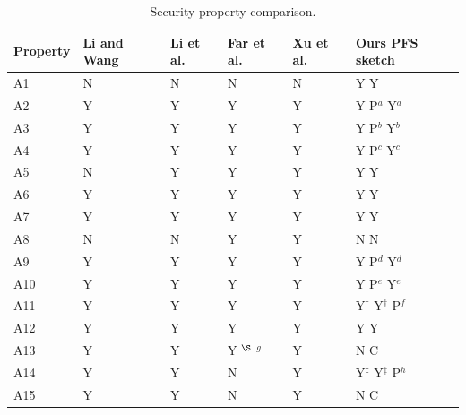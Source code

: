 \documentclass[cmc,article,submit,moreauthors,pdftex]{Definitions/tsp}
\providecommand{\DIFadd}[1]{{\protect\color{blue} \sf #1}} %
\providecommand{\DIFdel}[1]{{\protect\color{red} \scriptsize #1}} %
\providecommand{\DIFaddFL}[1]{\DIFadd{#1}} %
\providecommand{\DIFdelFL}[1]{\DIFdel{#1}} %
\providecommand{\DIFaddbeginFL}{} %
\providecommand{\DIFaddendFL}{} %
\providecommand{\DIFdelbeginFL}{} %
\providecommand{\DIFdelendFL}{} %
\begin{document}
\begin{table}[t]
\caption{Security-property comparison.\label{tab:security}}
\DIFdelbeginFL %
\DIFdelendFL \DIFaddbeginFL \begin{tabularx}{\textwidth}{lYYYYY}
\DIFaddendFL \toprule
\textbf{Property} & \textbf{Li and Wang \cite{li2019twofactor}} & \textbf{Li et al. \cite{li2018ecc}} & \textbf{Far et al. \cite{far}} & \textbf{Xu et al. \cite{xu}} & \textbf{Ours}\DIFdelbeginFL %
\DIFdelFL{\textbf{PFS sketch}}\DIFdelendFL \\
\midrule
A1  & N & N & N & N & Y\DIFdelbeginFL %
\DIFdelFL{Y}\DIFdelendFL \\
A2  & Y & Y & Y & Y & \DIFdelbeginFL \DIFdelFL{Y}\DIFdelendFL \DIFaddbeginFL \DIFaddFL{P}\DIFaddendFL $^{a}$\DIFdelbeginFL %
\DIFdelFL{Y$^{a}$}\DIFdelendFL \\
A3  & Y & Y & Y & Y & \DIFdelbeginFL \DIFdelFL{Y}\DIFdelendFL \DIFaddbeginFL \DIFaddFL{P}\DIFaddendFL $^{b}$\DIFdelbeginFL %
\DIFdelFL{Y$^{b}$}\DIFdelendFL \\
A4  & Y & Y & Y & Y & \DIFdelbeginFL \DIFdelFL{Y}\DIFdelendFL \DIFaddbeginFL \DIFaddFL{P}\DIFaddendFL $^{c}$\DIFdelbeginFL %
\DIFdelFL{Y$^{c}$}\DIFdelendFL \\
A5  & N & Y & Y & Y & Y\DIFdelbeginFL %
\DIFdelFL{Y}\DIFdelendFL \\
A6  & Y & Y & Y & Y & Y\DIFdelbeginFL %
\DIFdelFL{Y}\DIFdelendFL \\
A7  & Y & Y & Y & Y & Y\DIFdelbeginFL %
\DIFdelFL{Y}\DIFdelendFL \\
A8  & N & N & Y & Y & N\DIFdelbeginFL %
\DIFdelFL{N}\DIFdelendFL \\
A9  & Y & Y & Y & Y & \DIFdelbeginFL \DIFdelFL{Y}\DIFdelendFL \DIFaddbeginFL \DIFaddFL{P}\DIFaddendFL $^{d}$\DIFdelbeginFL %
\DIFdelFL{Y$^{d}$}\DIFdelendFL \\
A10 & Y & Y & Y & Y & \DIFdelbeginFL \DIFdelFL{Y}\DIFdelendFL \DIFaddbeginFL \DIFaddFL{P}\DIFaddendFL $^{e}$\DIFdelbeginFL %
\DIFdelFL{Y$^{e}$}\DIFdelendFL \\
A11 & Y & Y & Y & Y & \DIFdelbeginFL \DIFdelFL{Y$^{\dagger}$ }%
\DIFdelFL{Y$^{\dagger}$}\DIFdelendFL \DIFaddbeginFL \DIFaddFL{P$^{f}$}\DIFaddendFL \\
A12 & Y & Y & Y & Y & Y\DIFdelbeginFL %
\DIFdelFL{Y}\DIFdelendFL \\
\midrule
A13 & Y & Y & Y\DIFdelbeginFL \DIFdelFL{$^{\S}$ }\DIFdelendFL \DIFaddbeginFL \DIFaddFL{$^{g}$ }\DIFaddendFL & Y & N\DIFdelbeginFL %
\DIFdelFL{C}\DIFdelendFL \\
A14 & Y & Y & N & Y & \DIFdelbeginFL \DIFdelFL{Y$^{\ddagger}$ }%
\DIFdelFL{Y$^{\ddagger}$}\DIFdelendFL \DIFaddbeginFL \DIFaddFL{P$^{h}$}\DIFaddendFL \\
A15 & Y & Y & N & Y & N\DIFdelbeginFL %
\DIFdelFL{C}\DIFdelendFL \\
\bottomrule
\end{tabularx}


\end{table}
\end{document}
